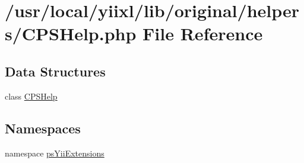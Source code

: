 \hypertarget{CPSHelp_8php}{
\section{/usr/local/yiixl/lib/original/helpers/CPSHelp.php File Reference}
\label{CPSHelp_8php}
}
\subsection*{Data Structures}
\begin{DoxyCompactItemize}
\item 
class \hyperlink{classCPSHelp}{CPSHelp}
\end{DoxyCompactItemize}
\subsection*{Namespaces}
\begin{DoxyCompactItemize}
\item 
namespace \hyperlink{namespacepsYiiExtensions}{psYiiExtensions}
\end{DoxyCompactItemize}
